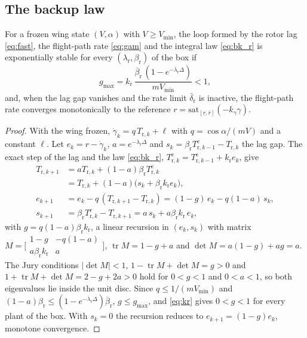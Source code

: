 \documentclass[final,5p,times,twocolumn]{elsarticle}
\begin{document}
\subsection{The backup law}
\begin{lemma}\label{lem:corner}
For a frozen wing state $(V,\alpha)$ with $V\ge V_{\min}$, the loop formed by the rotor lag \eqref{eq:fast}, the flight-path rate \eqref{eq:gam} and the integral law \eqref{eq:bk_r} is exponentially stable for every $(\lambda_{\mathrm r},\beta_{\mathrm r})$ of the box if
\begin{equation}\label{eq:kr}
g_{\max}=k_{\mathrm r}\,\frac{\overline\beta_{\mathrm r}\,(1-e^{-\overline\lambda_{\mathrm r}\Delta})}{mV_{\min}}<1,
\end{equation}
and, when the lag gap vanishes and the rate limit $\bar\delta_{\mathrm r}$ is inactive, the flight-path rate converges monotonically to the reference $r=\mathrm{sat}_{[\underline r,\overline r]}(-k_\gamma\gamma)$.
\end{lemma}
\begin{proof}
With the wing frozen, $\dot\gamma_k=q\,T_{\mathrm r,k}+\ell$ with $q=\cos\alpha/(mV)$ and a constant $\ell$. Let $e_k=r-\dot\gamma_k$, $a=e^{-\lambda_{\mathrm r}\Delta}$ and $s_k=\beta_{\mathrm r}T^{\mathrm c}_{\mathrm r,k-1}-T_{\mathrm r,k}$ the lag gap. The exact step of the lag and the law \eqref{eq:bk_r}, $T^{\mathrm c}_{\mathrm r,k}=T^{\mathrm c}_{\mathrm r,k-1}+k_{\mathrm r}e_k$, give
\begin{align}
T_{\mathrm r,k+1}&=aT_{\mathrm r,k}+(1-a)\beta_{\mathrm r}T^{\mathrm c}_{\mathrm r,k}\nonumber\\ &=T_{\mathrm r,k}+(1-a)\big(s_k+\beta_{\mathrm r}k_{\mathrm r}e_k\big),\\
e_{k+1}&=e_k-q\,(T_{\mathrm r,k+1}-T_{\mathrm r,k})=(1-g)\,e_k-q(1-a)\,s_k,\nonumber\\
s_{k+1}&=\beta_{\mathrm r}T^{\mathrm c}_{\mathrm r,k}-T_{\mathrm r,k+1}=a\,s_k+a\beta_{\mathrm r}k_{\mathrm r}\,e_k,
\end{align}
with $g=q(1-a)\beta_{\mathrm r}k_{\mathrm r}$, a linear recursion in $(e_k,s_k)$ with matrix $M=\big[\begin{smallmatrix}1-g&-q(1-a)\\ a\beta_{\mathrm r}k_{\mathrm r}&a\end{smallmatrix}\big]$, $\operatorname{tr}M=1-g+a$ and $\det M=a(1-g)+a g=a$. The Jury conditions $|\det M|<1$, $1-\operatorname{tr}M+\det M=g>0$ and $1+\operatorname{tr}M+\det M=2-g+2a>0$ hold for $0<g<1$ and $0<a<1$, so both eigenvalues lie inside the unit disc. Since $q\le1/(mV_{\min})$ and $(1-a)\beta_{\mathrm r}\le(1-e^{-\overline\lambda_{\mathrm r}\Delta})\overline\beta_{\mathrm r}$, $g\le g_{\max}$, and \eqref{eq:kr} gives $0<g<1$ for every plant of the box. With $s_k=0$ the recursion reduces to $e_{k+1}=(1-g)e_k$, monotone convergence.
\end{proof}
\end{document}

